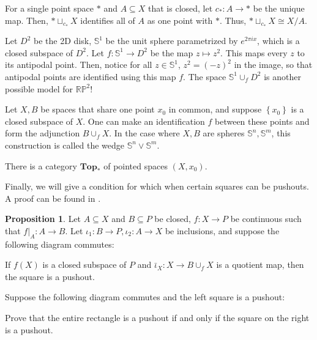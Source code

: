 \documentclass[12pt,reqno]{amsart}
\numberwithin{theorem}{section}
\theoremstyle{definition}
\theoremstyle{remark}
\numberwithin{equation}{section}
\renewcommand{\S}{\mathbb S}
\renewcommand{\P}{\mathbb{P}}
\newcommand{\set}[1]{\left \{ #1 \right \}}
\theoremstyle{definition}
\newtheorem{prop}[theorem]{Proposition}
\newcommand{\R}{\mathbb{R}}
\begin{document}
\begin{example}
    For a single point space $*$ and $A \subseteq X$ that is closed, let $c_*:A\rightarrow *$ be the unique map. Then, $*\sqcup_{c_*}X$ identifies all of $A$ as one point with $*$. Thus, $*\sqcup_{c_*}X \cong X/A$.
\end{example}
\begin{example}
    Let $D^2$ be the 2D disk, $\S^1$ be the unit sphere parametrized by $e^{2\pi i x}$, which is a closed subspace of $D^2$. Let $f:\S^{1} \rightarrow D^{2}$ be the map $z\mapsto z^2$. This maps every $z$ to its antipodal point. Then, notice for all $z \in \S^1$, $z^2 = (-z)^2$ in the image, so that antipodal points are identified using this map $f$. The space $\S^1 \cup_f D^2$ is another possible model for $\R\P^2$!
\end{example}
\begin{example}
    Let $X, B$ be spaces that share one point $x_0$ in common, and suppose $\set {x_0}$ is a closed subspace of $X$. One can make an identification $f$ between these points and form the adjunction $B\cup_fX$. In the case where $X,B$ are spheres $\S^n,\S^m$, this construction is called the wedge $\S^n \vee \S^m$.
\end{example}
\begin{remark}
    There is a category $\mathbf{Top}_*$ of pointed spaces $(X,x_0)$. 
\end{remark}

Finally, we will give a condition for which when certain squares can be pushouts. A proof can be found in \cite{brown}.
\begin{prop}
Let $A\subseteq X$ and $B\subseteq P$ be closed, $f:X\rightarrow P$ be continuous such that $f|_A: A \rightarrow B$. Let $\iota_1 :B \rightarrow P, \iota_2:A\rightarrow X$ be inclusions, and suppose the following diagram commutes:
\begin{center}
\end{center}
    If $f(X)$ is a closed subspace of $P$ and $\bar \iota_X:X\rightarrow B\cup_f X$ is a quotient map, then the square is a pushout.
\end{prop}

\begin{exercise}
    Suppose the following diagram commutes and the left square is a pushout:
    \begin{center}
    \end{center}
    Prove that the entire rectangle is a pushout if and only if the square on the right is a pushout.
\end{exercise}
\printbibliography
\end{document}
